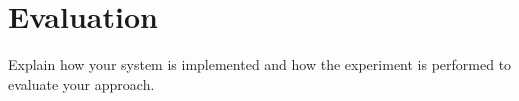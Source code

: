 \section{Evaluation}

Explain how your system is implemented and how the experiment is performed to evaluate your approach.